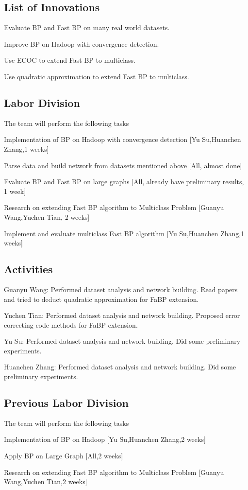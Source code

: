 \subsection{List of Innovations}
\bit
\item Evaluate BP and Fast BP on many real world datasets.
\item Improve BP on Hadoop with convergence detection.
\item Use ECOC to extend Fast BP to multiclass.
\item Use quadratic approximation to extend Fast BP to multiclass.
\eit

\subsection{Labor Division}

The team will perform the following tasks
\bit
\item Implementation of BP on Hadoop with convergence detection [Yu Su,Huanchen Zhang,1 weeks]
\item Parse data and build network from datasets mentioned above [All, almost done]
\item Evaluate BP and Fast BP on large graphs [All, already have preliminary results, 1 week]
\item Research on extending Fast BP algorithm to Multiclass Problem [Guanyu Wang,Yuchen Tian, 2 weeks]
\item Implement and evaluate multiclass Fast BP algorithm [Yu Su,Huanchen Zhang,1 weeks]
\eit

\subsection{Activities}
\bit
\item Guanyu Wang: Performed dataset analysis and network building. Read papers and tried to deduct quadratic approximation for FaBP extension.
\item Yuchen Tian: Performed dataset analysis and network building. Proposed error correcting code methods for FaBP extension.
\item Yu Su: Performed dataset analysis and network building. Did some preliminary experiments.
\item Huanchen Zhang: Performed dataset analysis and network building. Did some preliminary experiments.
\eit

\subsection{Previous Labor Division}

The team will perform the following tasks
\bit
\item Implementation of BP on Hadoop [Yu Su,Huanchen Zhang,2 weeks]
\item Apply BP on Large Graph [All,2 weeks]
\item Research on extending Fast BP algorithm to Multiclass Problem [Guanyu Wang,Yuchen Tian,2 weeks]
\eit

